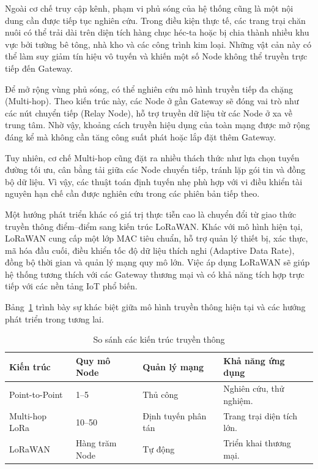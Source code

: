 Ngoài cơ chế truy cập kênh, phạm vi phủ sóng của hệ thống cũng là một nội dung cần được tiếp tục nghiên cứu. Trong điều kiện thực tế, các trang trại chăn nuôi có thể trải dài trên diện tích hàng chục héc-ta hoặc bị chia thành nhiều khu vực bởi tường bê tông, nhà kho và các công trình kim loại. Những vật cản này có thể làm suy giảm tín hiệu vô tuyến và khiến một số Node không thể truyền trực tiếp đến Gateway.

Để mở rộng vùng phủ sóng, có thể nghiên cứu mô hình truyền tiếp đa chặng (Multi-hop). Theo kiến trúc này, các Node ở gần Gateway sẽ đóng vai trò như các nút chuyển tiếp (Relay Node), hỗ trợ truyền dữ liệu từ các Node ở xa về trung tâm. Nhờ vậy, khoảng cách truyền hiệu dụng của toàn mạng được mở rộng đáng kể mà không cần tăng công suất phát hoặc lắp đặt thêm Gateway.

Tuy nhiên, cơ chế Multi-hop cũng đặt ra nhiều thách thức như lựa chọn tuyến đường tối ưu, cân bằng tải giữa các Node chuyển tiếp, tránh lặp gói tin và đồng bộ dữ liệu. Vì vậy, các thuật toán định tuyến nhẹ phù hợp với vi điều khiển tài nguyên hạn chế cần được nghiên cứu trong các phiên bản tiếp theo.

Một hướng phát triển khác có giá trị thực tiễn cao là chuyển đổi từ giao thức truyền thông điểm--điểm sang kiến trúc LoRaWAN. Khác với mô hình hiện tại, LoRaWAN cung cấp một lớp MAC tiêu chuẩn, hỗ trợ quản lý thiết bị, xác thực, mã hóa đầu cuối, điều khiển tốc độ dữ liệu thích nghi (Adaptive Data Rate), đồng bộ thời gian và quản lý mạng quy mô lớn. Việc áp dụng LoRaWAN sẽ giúp hệ thống tương thích với các Gateway thương mại và có khả năng tích hợp trực tiếp với các nền tảng IoT phổ biến.

Bảng~\ref{tab:lora_compare} trình bày sự khác biệt giữa mô hình truyền thông hiện tại và các hướng phát triển trong tương lai.

\begin{table}[H]
\centering
\caption{So sánh các kiến trúc truyền thông}
\label{tab:lora_compare}
\begin{tabular}{p{3cm} p{3cm} p{3cm} p{5cm}}
\hline
\textbf{Kiến trúc} &
\textbf{Quy mô Node} &
\textbf{Quản lý mạng} &
\textbf{Khả năng ứng dụng} \\
\hline
Point-to-Point &
1--5 &
Thủ công &
Nghiên cứu, thử nghiệm. \\

Multi-hop LoRa &
10--50 &
Định tuyến phân tán &
Trang trại diện tích lớn. \\

LoRaWAN &
Hàng trăm Node &
Tự động &
Triển khai thương mại. \\
\hline
\end{tabular}
\end{table}

